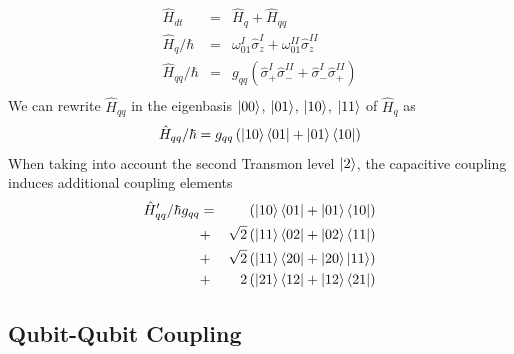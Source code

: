%
\begin{eqnarray}
\hat{H}_{dt}       & = & \hat{H}_q+\hat{H}_{qq} \\
\hat{H}_{q}/\hbar  & = & \omega_{01}^I\hat{\sigma}_z^I+\omega_{01}^{II}\hat{\sigma}_z^{II} \\
\hat{H}_{qq}/\hbar & = & g_{qq}\left(\hat{\sigma}_+^I\hat{\sigma}_-^{II}+\hat{\sigma}_-^I\hat{\sigma}_+^{II}\right) \\
\end{eqnarray}
%
We can rewrite $\hat{H}_{qq}$ in the eigenbasis $\left| 00 \right>$, $\left| 01 \right>$, $\left| 10 \right>$, $\left| 11 \right>$ of $\hat{H}_q$ as
%
\begin{equation}
\hat{H}_{qq}/\hbar = g_{qq}\left(\left| 10 \right>\left< 01 \right|+\left| 01 \right>\left< 10 \right|\right)
\end{equation}
%
When taking into account the second Transmon level $\left| 2 \right>$, the capacitive coupling induces additional coupling elements
%
\begin{eqnarray}
\hat{H}_{qq}'/\hbar g_{qq} &  = &  \left(\left| 10 \right>\left< 01 \right|+\left| 01 \right>\left< 10 \right|\right) \\
& + & \sqrt{2}\left(\left| 11 \right>\left< 02 \right|+\left| 02 \right>\left< 11 \right|\right) \\
& + & \sqrt{2}\left(\left| 11 \right>\left< 20 \right|+\left| 20 \right>\left| 11 \right>\right) \\
& + & 2\left(\left| 21 \right>\left< 12 \right|+\left| 12 \right>\left< 21 \right|\right)
\end{eqnarray}
%
\subsection{Qubit-Qubit Coupling}

